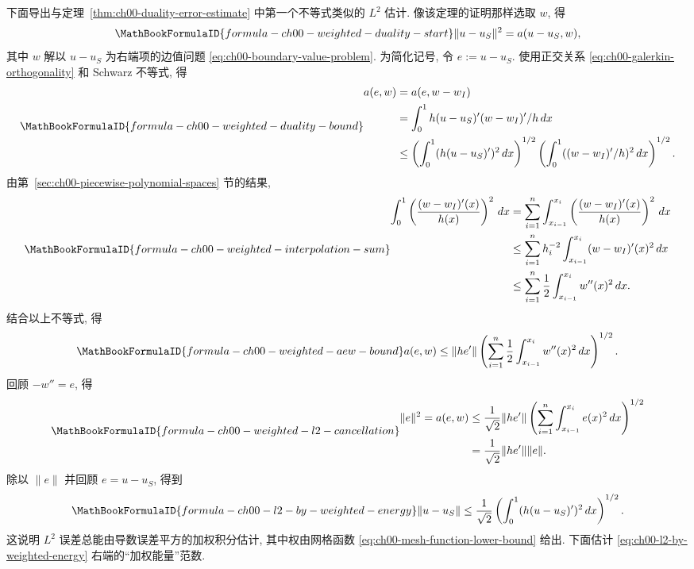 下面导出与定理~\ref{thm:ch00-duality-error-estimate} 中第一个不等式类似的 $L^2$ 估计. 像该定理的证明那样选取 $w$, 得
\[
\MathBookFormulaID{formula-ch00-weighted-duality-start}
\|u-u_S\|^2=a(u-u_S,w),
\]
其中 $w$ 解以 $u-u_S$ 为右端项的边值问题 \eqref{eq:ch00-boundary-value-problem}. 为简化记号, 令 $e:=u-u_S$. 使用正交关系 \eqref{eq:ch00-galerkin-orthogonality} 和 Schwarz 不等式, 得
\[
\MathBookFormulaID{formula-ch00-weighted-duality-bound}
\begin{aligned}
a(e,w)&=a(e,w-w_I)\\
&=\int_0^1h(u-u_S)'(w-w_I)'/h\,dx\\
&\leq
\left(\int_0^1(h(u-u_S)')^2\,dx\right)^{1/2}
\left(\int_0^1((w-w_I)'/h)^2\,dx\right)^{1/2}.
\end{aligned}
\]
由第~\ref{sec:ch00-piecewise-polynomial-spaces} 节的结果,
\[
\MathBookFormulaID{formula-ch00-weighted-interpolation-sum}
\begin{aligned}
\int_0^1\left(\frac{(w-w_I)'(x)}{h(x)}\right)^2\,dx
&=\sum_{i=1}^n\int_{x_{i-1}}^{x_i}
\left(\frac{(w-w_I)'(x)}{h(x)}\right)^2\,dx\\
&\leq\sum_{i=1}^nh_i^{-2}\int_{x_{i-1}}^{x_i}(w-w_I)'(x)^2\,dx\\
&\leq\sum_{i=1}^n\frac12\int_{x_{i-1}}^{x_i}w''(x)^2\,dx.
\end{aligned}
\]
结合以上不等式, 得
\begin{equation}
\MathBookFormulaID{formula-ch00-weighted-aew-bound}
a(e,w)\leq\|he'\|
\left(\sum_{i=1}^n\frac12\int_{x_{i-1}}^{x_i}w''(x)^2\,dx\right)^{1/2}.
\label{eq:ch00-weighted-aew-bound}
\end{equation}
回顾 $-w''=e$, 得
\[
\MathBookFormulaID{formula-ch00-weighted-l2-cancellation}
\begin{aligned}
\|e\|^2=a(e,w)
&\leq\frac1{\sqrt2}\|he'\|
\left(\sum_{i=1}^n\int_{x_{i-1}}^{x_i}e(x)^2\,dx\right)^{1/2}\\
&=\frac1{\sqrt2}\|he'\|\|e\|.
\end{aligned}
\]
除以 $\|e\|$ 并回顾 $e=u-u_S$, 得到
\begin{equation}
\MathBookFormulaID{formula-ch00-l2-by-weighted-energy}
\|u-u_S\|\leq\frac1{\sqrt2}
\left(\int_0^1(h(u-u_S)')^2\,dx\right)^{1/2}.
\label{eq:ch00-l2-by-weighted-energy}
\end{equation}
这说明 $L^2$ 误差总能由导数误差平方的加权积分估计, 其中权由网格函数 \eqref{eq:ch00-mesh-function-lower-bound} 给出. 下面估计 \eqref{eq:ch00-l2-by-weighted-energy} 右端的``加权能量''范数.

